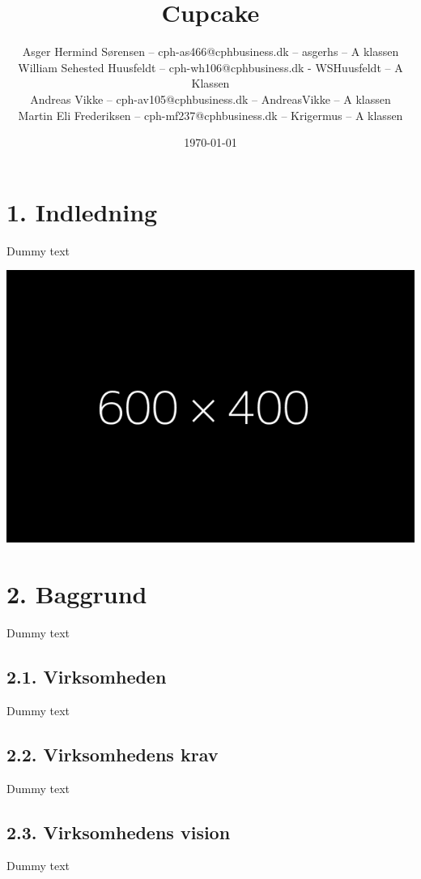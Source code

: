 \documentclass[11pt]{report}
\title{Cupcake}
\author{
Asger Hermind Sørensen – cph-as466@cphbusiness.dk – asgerhs –
  A klassen\\ William Sehested Huusfeldt – cph-wh106@cphbusiness.dk -
  WSHuusfeldt – A Klassen\\ Andreas Vikke – cph-av105@cphbusiness.dk –
  AndreasVikke – A klassen\\ Martin Eli Frederiksen –
  cph-mf237@cphbusiness.dk – Krigermus – A klassen}
\date{\today}
\begin{document}
\maketitle

\renewcommand{\cftchapleader}{\cftdotfill{\cftdotsep}}
\tableofcontents
\newpage

\chapter*{1. Indledning}
Dummy text
\begin{center}
\includegraphics[width=15cm]{fff.png}
\end{center}

\newpage

\chapter*{2. Baggrund}
Dummy text
\section*{2.1. Virksomheden}
Dummy text
\section*{2.2. Virksomhedens krav}
Dummy text
\section*{2.3. Virksomhedens vision}
Dummy text
\end{document}
